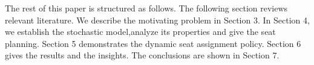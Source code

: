 

The rest of this paper is structured as follows. The following section reviews relevant literature. We describe the motivating problem in Section 3. In Section 4, we establish the stochastic model,analyze its properties and give the seat planning. Section 5 demonstrates the dynamic seat assignment policy. Section 6 gives the results and the insights. The conclusions are shown in Section 7.
\newpage
